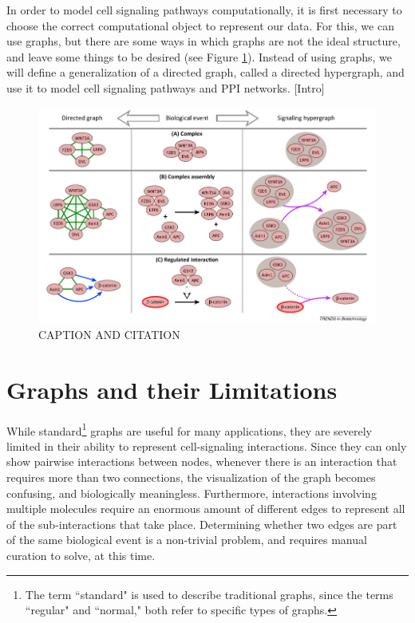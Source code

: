 \documentclass[12pt,twoside]{reedthesis}
\newcommand{\new}[2]{{\color{purple}#1 [#2]}}
\theoremstyle{definition}
\begin{document}
\new{In order to model cell signaling pathways computationally, it is first necessary to choose the correct computational object to represent our data. For this, we can use graphs, but there are some ways in which graphs are not the ideal structure, and leave some things to be desired (see Figure \ref{fig:anna_fig}). Instead of using graphs, we will define a generalization of a directed graph, called a directed hypergraph, and use it to model cell signaling pathways and PPI networks.}{Intro}

\begin{figure}[h]
  \begin{center}
    \includegraphics[width=\textwidth]{anna_fig}
  \caption[The issue with standard graphs.]{CAPTION AND CITATION}
  \label{fig:anna_fig}
  \end{center}
\end{figure}

\section{Graphs and their Limitations}

While standard\footnote{The term ``standard" is used to describe traditional graphs, since the terms ``regular" and ``normal," both refer to specific types of graphs.} graphs are useful for many applications, they are severely limited in their ability to represent cell-signaling interactions.  Since they can only show pairwise interactions between nodes, whenever there is an interaction that requires more than two connections, the visualization of the graph becomes confusing, and biologically meaningless.  Furthermore, interactions involving multiple molecules require an enormous amount of different edges to represent all of the sub-interactions that take place.  Determining whether two edges are part of the same biological event is a non-trivial problem, and requires manual curation to solve, at this time.\par
\end{document}
